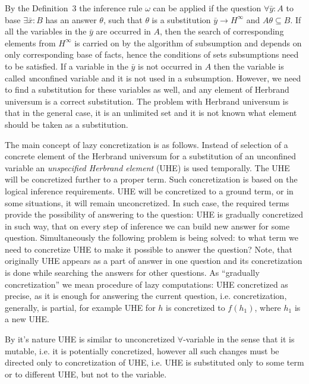 \documentclass[runningheads,a4paper]{llncs}
\begin{document}
By the Definition~3 the inference rule $\omega$ can be applied if the question $\forall \bar{y}\colon A$ to base $\exists \bar{x}\colon B$ has an answer $\theta$, such that $\theta$ is a substitution $\bar{y} \rightarrow H^{\infty}$ and $A\theta \subseteq B$. If all the variables in the $\bar{y}$ are occurred in $A$, then the search of corresponding elements from $H^{\infty}$ is carried on by the algorithm of subsumption and depends on only corresponding base of facts, hence the conditions of sets subsumptions need to be satisfied. If a variable in the $\bar{y}$ is not occurred in $A$ then the variable is called {\emph unconfined variable} and it is not used in a subsumption. However, we need to find a substitution for these variables as well, and any element of Herbrand universum is a correct substitution. The problem with Herbrand universum is that in the general case, it is an unlimited set and it is not known what element should be taken as a substitution.

The main concept of lazy concretization is as follows. Instead of selection of a concrete element of the Herbrand universum for a substitution of an unconfined variable an {\em unspecified Herbrand element} (UHE) is used temporally. The UHE will be concretized further to a proper term. Such concretization is based on the logical inference requirements. UHE will be concretized to a ground term, or in some situations, it will remain unconcretized. In such case, the required terms provide the possibility of answering to the question: UHE is gradually concretized in such way, that on every step of inference we can build new answer for some question. Simultaneously the following problem is being solved: to what term we need to concretize UHE to make it possible to answer the question? Note, that originally UHE appears as a part of answer in one question and its concretization is done while searching the answers for other questions. As ``gradually concretization'' we mean procedure of lazy computations: UHE concretized as precise, as it is enough for answering the current question, i.e. concretization, generally, is partial, for example UHE for $h$ is concretized to $f(h_1)$, where $h_1$ is a new UHE.

By it's nature UHE is similar to unconcretized $\forall$-variable in the sense that it is mutable, i.e. it is potentially concretized, however all such changes must be directed only to concretization of UHE, i.e. UHE is substituted only to some term or to different UHE, but not to the variable.
\end{document}
